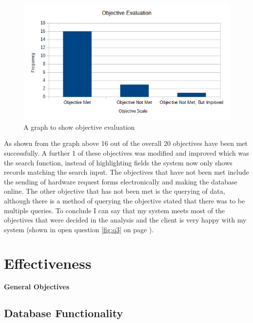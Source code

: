 \begin{figure}[H]
    \includegraphics[width=\textwidth]{./Evaluation/EvaluationQuestionnaire/graph2.png}
    \caption{A graph to show objective evaluation} \label{graph2}
\end{figure}

As shown from the graph above 16 out of the overall 20 objectives have been met successfully. A further 1 of these objectives was modified and improved which was the search function, instead of highlighting fields the system now only shows records matching the search input. The objectives that have not been met include the sending of hardware request forms electronically and making the database online. The other objective that has not been met is the querying of data, although there is a method of querying the objective stated that there was to be multiple queries. To conclude I can say that my system meets most of the objectives that were decided in the analysis and the client is very happy with my system (shown in open question \ref{fig:q3} on page \pageref{fig:q3}).

\section{Effectiveness}

\paragraph{General Objectives}

\subsection{Database Functionality}\label{staffhardware}

